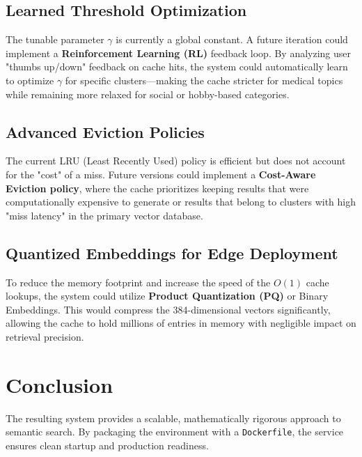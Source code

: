 \documentclass[11pt,a4paper]{article}
\begin{document}
\subsection{Learned Threshold Optimization}
The tunable parameter $\gamma$ is currently a global constant. A future iteration could implement a \textbf{Reinforcement Learning (RL)} feedback loop. By analyzing user "thumbs up/down" feedback on cache hits, the system could automatically learn to optimize $\gamma$ for specific clusters—making the cache stricter for medical topics while remaining more relaxed for social or hobby-based categories.

\subsection{Advanced Eviction Policies}
The current LRU (Least Recently Used) policy is efficient but does not account for the "cost" of a miss. Future versions could implement a \textbf{Cost-Aware Eviction policy}, where the cache prioritizes keeping results that were computationally expensive to generate or results that belong to clusters with high "miss latency" in the primary vector database.

\subsection{Quantized Embeddings for Edge Deployment}
To reduce the memory footprint and increase the speed of the $O(1)$ cache lookups, the system could utilize \textbf{Product Quantization (PQ)} or Binary Embeddings. This would compress the 384-dimensional vectors significantly, allowing the cache to hold millions of entries in memory with negligible impact on retrieval precision.

\section{Conclusion}
The resulting system provides a scalable, mathematically rigorous approach to semantic search. By packaging the environment with a \texttt{Dockerfile}, the service ensures clean startup and production readiness.
\end{document}
